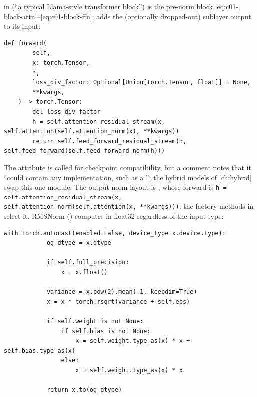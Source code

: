 \begin{implnote}[title={In the code: the block and RMSNorm in OLMo-core}]
 in
 (``a typical
Llama-style transformer block'') is the pre-norm block
\eqref{eq:c01-block-attn}--\eqref{eq:c01-block-ffn};  adds the
(optionally dropped-out) sublayer output to its input:
\begin{lstlisting}[caption={Excerpt from \texttt{repos/\allowbreak allenai\_\_OLMo-core/\allowbreak src/\allowbreak olmo\_core/\allowbreak nn/\allowbreak transformer/\allowbreak block.py}},label={lst:c01-olmo-block}]
    def forward(
        self,
        x: torch.Tensor,
        *,
        loss_div_factor: Optional[Union[torch.Tensor, float]] = None,
        **kwargs,
    ) -> torch.Tensor:
        del loss_div_factor
        h = self.attention_residual_stream(x, self.attention(self.attention_norm(x), **kwargs))
        return self.feed_forward_residual_stream(h, self.feed_forward(self.feed_forward_norm(h)))
\end{lstlisting}
The attribute is called  for checkpoint compatibility, but a comment
notes that it ``could contain any  implementation, such as a
'': the hybrid models of \cref{ch:hybrid} swap this one module. The
output-norm layout is , whose forward is
\texttt{h = self.attention\_residual\_stream(x, self.attention\_norm(self.attention(x, **kwargs)))}; the
 factory methods in
 select it.
RMSNorm () computes in
float32 regardless of the input type:
\begin{lstlisting}[caption={Excerpt from \texttt{repos/\allowbreak allenai\_\_OLMo-core/\allowbreak src/\allowbreak olmo\_core/\allowbreak nn/\allowbreak layer\_norm.py}},label={lst:c01-olmo-rmsnorm}]
        with torch.autocast(enabled=False, device_type=x.device.type):
            og_dtype = x.dtype

            if self.full_precision:
                x = x.float()

            variance = x.pow(2).mean(-1, keepdim=True)
            x = x * torch.rsqrt(variance + self.eps)

            if self.weight is not None:
                if self.bias is not None:
                    x = self.weight.type_as(x) * x + self.bias.type_as(x)
                else:
                    x = self.weight.type_as(x) * x

            return x.to(og_dtype)
\end{lstlisting}
\end{implnote}


